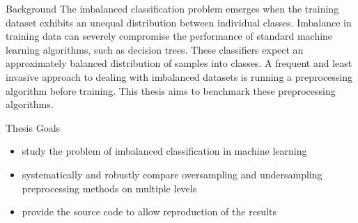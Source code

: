 \documentclass[a0paper, portrait, fontscale=0.255]{baposter}
\begin{document}
\begin{poster}
\begin{posterbox}[column=0, name=background]{Background}
    The imbalanced classification problem emerges when the training dataset exhibits an unequal
    distribution between individual classes. Imbalance in training data can severely compromise the
    performance of standard machine learning algorithms, such as decision trees. These classifiers
    expect an approximately balanced distribution of samples into classes. A frequent and least
    invasive approach to dealing with imbalanced datasets is running a preprocessing algorithm
    before training. This thesis aims to benchmark these preprocessing algorithms.

\end{posterbox}


\begin{posterbox}[
    column=0, name=goals, below=background, headerColorOne=blue!60, boxColorOne=blue!20
]{Thesis Goals}
    \begin{itemize}[leftmargin=1.2em]
        \item study the problem of imbalanced classification in machine learning
        \item systematically and robustly compare oversampling and undersampling preprocessing
            methods on multiple levels
        \item provide the source code to allow reproduction of the results
    \end{itemize}
\end{posterbox}



\end{poster}
\end{document}
